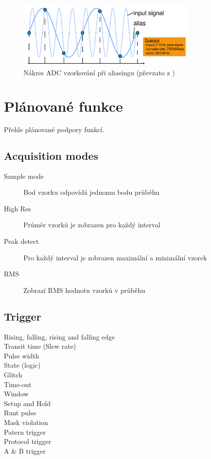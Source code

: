 \documentclass[12pt]{article}
\begin{document}
\begin{figure}[h]
    \centering
    \includegraphics[width=0.8\textwidth]{adc-aliasing}
    \caption{Nákres ADC vzorkování při aliasingu (převzato z \cite{OscilloscopeBasicsPrimer})}
    \label{fig:adc-aliasing}
\end{figure}

\newpage

\section{Plánované funkce}

Přehle plánované podpory funkcí.

\subsection{Acquisition modes}

 

\begin{description}
    \item [Sample mode] Bod vzorku odpovídá jednomu bodu průběhu
    \item [High Res] Průměr vzorků je zobrazen pro každý interval
    \item [Peak detect] Pro každý interval je zobrazen maximální a minimální vzorek
    \item [RMS] Zobrazí RMS hodnotu vzorků v průběhu
\end{description}

\subsection{Trigger}

\begin{description}
    \item [Rising, falling, rising and falling edge]
    \item [Transit time (Slew rate)]
    \item [Pulse width]
    \item [State (logic)]
    \item [Glitch]
    \item [Time-out]
    \item [Window]
    \item [Setup and Hold]
    \item [Runt pulse]
    \item [Mask violation]
    \item [Patern trigger]
    \item [Protocol trigger]
    \item [A \& B trigger]
\end{description}
\end{document}

